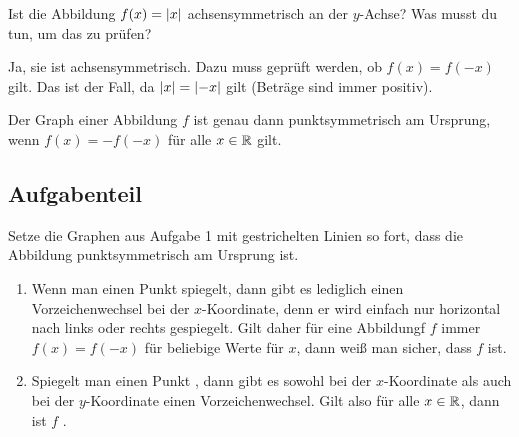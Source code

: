 \documentclass[]{uebungsblatt}
\begin{document}
\begin{exercise}
    Ist die Abbildung $f(x)=\lvert x\rvert$ achsensymmetrisch an der $y$-Achse? Was musst du tun, um das zu prüfen?
    \begin{answerbox}[.5in]
        Ja, sie ist achsensymmetrisch. Dazu muss geprüft werden, ob $f(x)=f(-x)$ gilt. Das ist der Fall, da $\lvert x\rvert=\lvert-x\rvert$ gilt (Beträge sind immer positiv).
    \end{answerbox}
\end{exercise}
\newpage
\begin{theorem}
    Der Graph einer Abbildung $f$ ist genau dann punktsymmetrisch am Ursprung, wenn $f(x)=-f(-x)$ für alle $x\in\mathbb{R}$ gilt.
\end{theorem}
\subsection*{Aufgabenteil}
\begin{exercise}
    Setze die Graphen aus Aufgabe 1 mit gestrichelten Linien so fort, dass die Abbildung punktsymmetrisch am Ursprung ist.
\end{exercise}
\begin{exercise}
    \begin{enumerate}[label=\alph*)]
        \item Wenn man einen Punkt  spiegelt, dann gibt es lediglich einen Vorzeichenwechsel bei der $x$-Koordinate, denn er wird einfach nur horizontal nach links oder rechts gespiegelt. Gilt daher für eine Abbildungf $f$ immer $f(x)=f(-x)$ für beliebige Werte für $x$, dann weiß man sicher, dass $f$  ist.
        \item Spiegelt man einen Punkt , dann gibt es sowohl bei der $x$-Koordinate als auch bei der $y$-Koordinate einen Vorzeichenwechsel. Gilt also  für alle $x\in\mathbb{R}$, dann ist $f$  .
    \end{enumerate}
\end{exercise}
\end{document}
